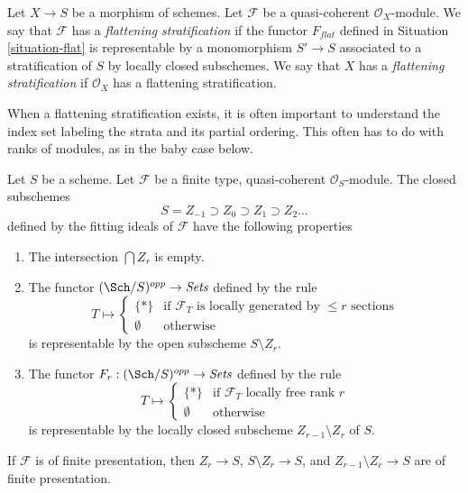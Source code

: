 \begin{definition}
\label{definition-flattening-stratification}
Let $X \to S$ be a morphism of schemes.
Let $\mathcal{F}$ be a quasi-coherent $\mathcal{O}_X$-module.
We say that $\mathcal{F}$ has a {\it flattening stratification}
if the functor $F_{flat}$ defined in Situation \ref{situation-flat}
is representable by a monomorphism $S' \to S$ associated
to a stratification of $S$ by locally closed subschemes.
We say that $X$ has a {\it flattening stratification}
if $\mathcal{O}_X$ has a flattening stratification.
\end{definition}

\noindent
When a flattening stratification exists, it is often important
to understand the index set labeling the strata and its partial ordering.
This often has to do with ranks of modules, as in the baby case below.

\begin{lemma}
\label{lemma-locally-free-rank-r-pullback}
Let $S$ be a scheme. Let $\mathcal{F}$ be a finite type, quasi-coherent
$\mathcal{O}_S$-module. The closed subschemes
$$
S = Z_{-1} \supset Z_0 \supset Z_1 \supset Z_2 \ldots
$$
defined by the fitting ideals of $\mathcal{F}$ have the following
properties
\begin{enumerate}
\item The intersection $\bigcap Z_r$ is empty.
\item The functor $(\Sch/S)^{opp} \to \textit{Sets}$ defined by the rule
$$
T \longmapsto
\left\{
\begin{matrix}
\{*\} & \text{if }\mathcal{F}_T\text{ is locally generated by }
\leq r\text{ sections} \\
\emptyset & \text{otherwise}
\end{matrix}
\right.
$$
is representable by the open subscheme $S \setminus Z_r$.
\item The functor $F_r : (\Sch/S)^{opp} \to \textit{Sets}$ defined by the rule
$$
T \longmapsto
\left\{
\begin{matrix}
\{*\} & \text{if }\mathcal{F}_T\text{ locally free rank }r\\
\emptyset & \text{otherwise}
\end{matrix}
\right.
$$
is representable by the locally closed subscheme $Z_{r - 1} \setminus Z_r$
of $S$.
\end{enumerate}
If $\mathcal{F}$ is of finite presentation, then
$Z_r \to S$, $S \setminus Z_r \to S$, and $Z_{r - 1} \setminus Z_r \to S$
are of finite presentation.
\end{lemma}

